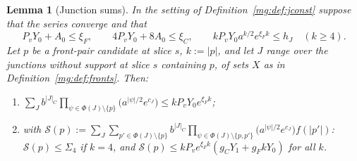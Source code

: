 \documentclass[11pt,a4paper]{article}
\newtheorem{lemma}[theorem]{Lemma}
\theoremstyle{definition}
\theoremstyle{remark}
\begin{document}
\begin{lemma}[Junction sums]\label{mg:lem:jsums}
In the setting of Definition~\ref{mg:def:jconst} suppose that the series converge and that
\[
P_vY_0+A_0\le\xi_F,\qquad4P_vY_0+8A_0\le\xi_C,\qquad kP_vY_0a^{k/2}e^{\xi_Fk}\le h_J\quad(k\ge4).
\]
Let $p$ be a front-pair candidate at slice $s$, $k:=|p|$, and let $J$ range over the junctions without support at slice $s$ containing $p$, of sets $X$ as
in Definition~\ref{mg:def:fronts}. Then:
\begin{enumerate}[label=(\roman*)]
\item $\displaystyle\sum_Jb^{|J|_C}\prod_{\psi\in\Phi(J)\setminus\{p\}}\bigl(a^{|\psi|/2}e^{c_J}\bigr)\le kP_vY_0e^{\xi_Fk}$;
\item with $\mathcal S(p):=\sum_J\sum_{p'\in\Phi(J)\setminus\{p\}}b^{|J|_C}\prod_{\psi\in\Phi(J)\setminus\{p,p'\}}\bigl(a^{|\psi|/2}e^{c_J}\bigr)f(|p'|)$:
$\mathcal S(p)\le\Sigma_4$ if $k=4$, and $\mathcal S(p)\le kP_ve^{\xi_Fk}(g_CY_1+g_FkY_0)$ for all $k$.
\end{enumerate}
\end{lemma}
\end{document}
